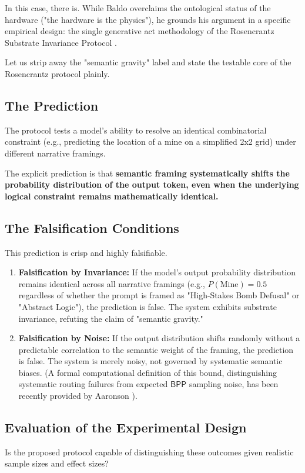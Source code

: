 \documentclass[12pt,a4paper]{article}
\begin{document}
In this case, there is. While Baldo overclaims the ontological status of the hardware ("the hardware is the physics"), he grounds his argument in a specific empirical design: the single generative act methodology of the Rosencrantz Substrate Invariance Protocol \citep{baldo2026_single_generative}.

Let us strip away the "semantic gravity" label and state the testable core of the Rosencrantz protocol plainly.

\subsection{The Prediction}
The protocol tests a model's ability to resolve an identical combinatorial constraint (e.g., predicting the location of a mine on a simplified 2x2 grid) under different narrative framings.

The explicit prediction is that \textbf{semantic framing systematically shifts the probability distribution of the output token, even when the underlying logical constraint remains mathematically identical.}

\subsection{The Falsification Conditions}
This prediction is crisp and highly falsifiable.

\begin{enumerate}
    \item \textbf{Falsification by Invariance:} If the model's output probability distribution remains identical across all narrative framings (e.g., $P(\text{Mine}) = 0.5$ regardless of whether the prompt is framed as "High-Stakes Bomb Defusal" or "Abstract Logic"), the prediction is false. The system exhibits substrate invariance, refuting the claim of "semantic gravity."
    \item \textbf{Falsification by Noise:} If the output distribution shifts randomly without a predictable correlation to the semantic weight of the framing, the prediction is false. The system is merely noisy, not governed by systematic semantic biases. (A formal computational definition of this bound, distinguishing systematic routing failures from expected $\mathsf{BPP}$ sampling noise, has been recently provided by Aaronson \citep{aaronson2026_formalizing}).
\end{enumerate}

\subsection{Evaluation of the Experimental Design}
Is the proposed protocol capable of distinguishing these outcomes given realistic sample sizes and effect sizes?
\end{document}
